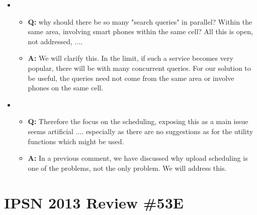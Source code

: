 \begin{itemize}
\item
\begin{itemize}
\item \textbf{Q: } why should there be so many "search queries" in
  parallel? Within the same area, involving smart phones within the
  same cell?  All this is open, not addressed, ....
\item \textbf{A: } We will clarify this. In the limit, if such a
  service becomes very popular, there will be with many concurrent
  queries. For our solution to be useful, the queries need not come
  from the same area or involve phones on the same cell.
\end{itemize}

\item
\begin{itemize}
\item \textbf{Q: } Therefore the focus on the scheduling, exposing
  this as a main issue seems artificial ....  especially as there are
  no suggestions as for the utility functions which might be used.
\item \textbf{A: } In a previous comment, we have discussed why upload
  scheduling is one of the problems, not the only problem. We will
  address this.
\end{itemize}
\end{itemize}

\section{IPSN 2013 Review \#53E}

